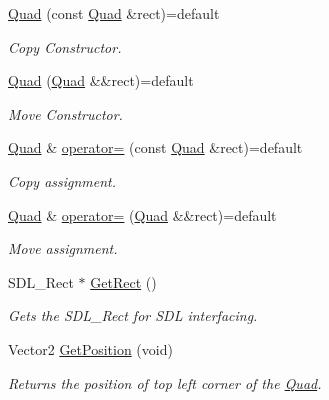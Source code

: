 \begin{DoxyCompactItemize}
\mbox{\hyperlink{classinferno_1_1graphics_1_1_quad_a9d9cc7ada7648b434b7401d88435530f}{Quad}} (const \mbox{\hyperlink{classinferno_1_1graphics_1_1_quad}{Quad}} \&rect)=default
\begin{DoxyCompactList}\small\item\em Copy Constructor. \end{DoxyCompactList}\item 
\mbox{\hyperlink{classinferno_1_1graphics_1_1_quad_a6c4c6693883f26437908876e72aba247}{Quad}} (\mbox{\hyperlink{classinferno_1_1graphics_1_1_quad}{Quad}} \&\&rect)=default
\begin{DoxyCompactList}\small\item\em Move Constructor. \end{DoxyCompactList}\item 
\mbox{\hyperlink{classinferno_1_1graphics_1_1_quad}{Quad}} \& \mbox{\hyperlink{classinferno_1_1graphics_1_1_quad_ab2956c4435741605c0943d5e6087e690}{operator=}} (const \mbox{\hyperlink{classinferno_1_1graphics_1_1_quad}{Quad}} \&rect)=default
\begin{DoxyCompactList}\small\item\em Copy assignment. \end{DoxyCompactList}\item 
\mbox{\hyperlink{classinferno_1_1graphics_1_1_quad}{Quad}} \& \mbox{\hyperlink{classinferno_1_1graphics_1_1_quad_a2061f2390481b6c66187c8c7377e085d}{operator=}} (\mbox{\hyperlink{classinferno_1_1graphics_1_1_quad}{Quad}} \&\&rect)=default
\begin{DoxyCompactList}\small\item\em Move assignment. \end{DoxyCompactList}\item 
S\+D\+L\+\_\+\+Rect $\ast$ \mbox{\hyperlink{classinferno_1_1graphics_1_1_quad_a237bc92de4fbd9b77255e56c0e4c15ce}{Get\+Rect}} ()
\begin{DoxyCompactList}\small\item\em Gets the S\+D\+L\+\_\+\+Rect for S\+DL interfacing. \end{DoxyCompactList}\item 
Vector2 \mbox{\hyperlink{classinferno_1_1graphics_1_1_quad_a8e6e9aad8b00849c87acd35a614cea84}{Get\+Position}} (void)
\begin{DoxyCompactList}\small\item\em Returns the position of top left corner of the \mbox{\hyperlink{classinferno_1_1graphics_1_1_quad}{Quad}}. \end{DoxyCompactList}\item 

\end{DoxyCompactItemize}
